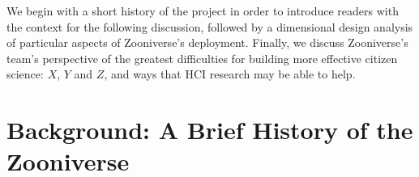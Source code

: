\documentclass{sigchi}
\begin{document}
We begin with a short history of the project in order to introduce readers with the context for the following discussion, followed by a dimensional design analysis of particular aspects of Zooniverse's deployment.  Finally, we discuss Zooniverse's team's perspective of the greatest difficulties for building more effective citizen science: $X$, $Y$ and $Z$, and ways that HCI research may be able to help.



\section{Background: A Brief History of the Zooniverse}



\end{document}
